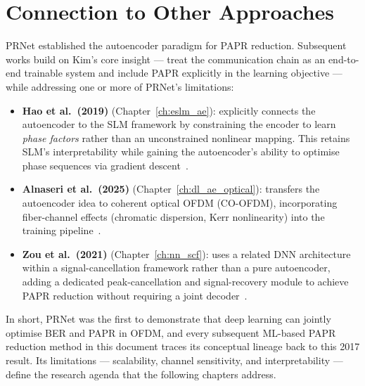 \section{Connection to Other Approaches}
\label{sec:prnet_connections}

PRNet established the autoencoder paradigm for PAPR reduction.  Subsequent
works build on Kim's core insight --- treat the communication chain as an
end-to-end trainable system and include PAPR explicitly in the learning
objective --- while addressing one or more of PRNet's limitations:

\begin{itemize}
    \item \textbf{Hao et al.\ (2019)} (Chapter~\ref{ch:eslm_ae}):
          explicitly connects the autoencoder to the SLM framework by
          constraining the encoder to learn \emph{phase factors} rather
          than an unconstrained nonlinear mapping.  This retains SLM's
          interpretability while gaining the autoencoder's ability to
          optimise phase sequences via gradient
          descent~\cite{hao2019extended}.

    \item \textbf{Alnaseri et al.\ (2025)} (Chapter~\ref{ch:dl_ae_optical}):
          transfers the autoencoder idea to coherent optical OFDM
          (CO-OFDM), incorporating fiber-channel effects (chromatic
          dispersion, Kerr nonlinearity) into the training
          pipeline~\cite{alnaseri2025deep}.

    \item \textbf{Zou et al.\ (2021)} (Chapter~\ref{ch:nn_scf}):
          uses a related DNN architecture within a signal-cancellation
          framework rather than a pure autoencoder, adding a dedicated
          peak-cancellation and signal-recovery module to achieve PAPR
          reduction without requiring a joint decoder~\cite{zou2021novel}.
\end{itemize}

In short, PRNet was the first to demonstrate that deep learning can jointly
optimise BER and PAPR in OFDM, and every subsequent ML-based PAPR reduction
method in this document traces its conceptual lineage back to this 2017
result.  Its limitations --- scalability, channel sensitivity, and
interpretability --- define the research agenda that the following chapters
address.
